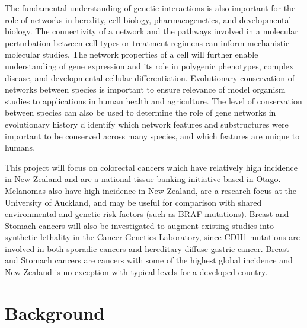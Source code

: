 The fundamental understanding of genetic interactions is also important for the role of networks in heredity, cell biology, pharmacogenetics, and developmental biology. The connectivity of a network and the pathways involved in a molecular perturbation between cell types or treatment regimens can inform mechanistic molecular studies. The network properties of a cell will further enable understanding of gene expression and its role in polygenic phenotypes, complex disease, and developmental cellular differentiation. Evolutionary conservation of networks between species is important to ensure relevance of model organism studies to applications in human health and agriculture. The level of conservation between species can also be used to determine the role of gene networks in evolutionary history d identify which network features and substructures were important to be conserved across many species, and which features are unique to humans.

This project will focus on colorectal cancers which have relatively high incidence in New Zealand and are a national tissue banking initiative based in Otago. Melanomas also have high incidence in New Zealand, are a research focus at the University of Auckland, and may be useful for comparison with shared environmental and genetic risk factors (such as BRAF mutations). Breast and Stomach cancers will also be investigated to augment existing studies into synthetic lethality in the Cancer Genetics Laboratory, since CDH1 mutations are involved in both sporadic cancers and hereditary diffuse gastric cancer. Breast and Stomach cancers are cancers with some of the highest global incidence and New Zealand is no exception with typical levels for a developed country.


\section{Background}

